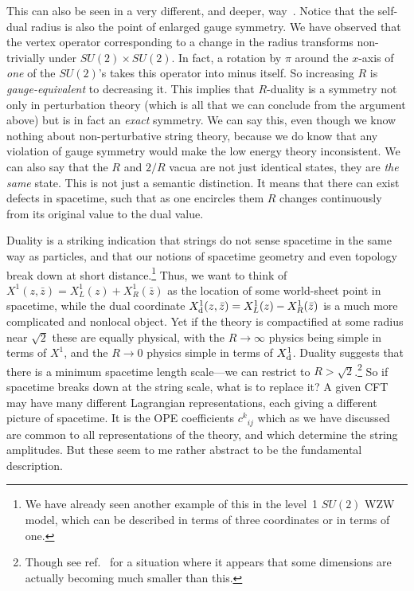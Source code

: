 This can also be seen in a very different, and deeper,
way~\cite{DHS}. Notice that the self-dual radius is also the point of
enlarged gauge symmetry.  We have observed that the vertex operator
corresponding to a change in the radius transforms non-trivially
under $SU(2) \times SU(2)$.  In fact, a rotation by $\pi$ around the
$x$-axis of {\it one} of the $SU(2)$'s takes this operator into minus
itself. So increasing $R$ is {\it gauge-equivalent} to decreasing it.
This implies that $R$-duality is a symmetry not only in perturbation
theory (which is all that we can conclude from the argument above)
but is in fact an {\it exact} symmetry.  We can say this, even
though we know nothing about non-perturbative string theory,
because we do know that any violation of gauge symmetry would make
the low energy theory inconsistent.  We can also say that the
$R$ and $2/R$ vacua are not just identical states, they are {\it the
same} state.  This is not just a semantic distinction.  It means
that there can exist defects in spacetime, such that as one
encircles them $R$ changes continuously from its original value
to the dual value.

Duality is a striking indication that strings do not sense
spacetime in the same way as particles, and that our
notions of spacetime geometry and even topology break down at short
distance.\footnote{We have already seen another example of this in the
level~1 $SU(2)$ WZW model, which can be described in terms of three
coordinates or in terms of one.}  Thus, we want to
think of $X^{1}(z,\bar z) = X^{1}_L(z) + X^{1}_R(\bar z)$ as the
location of some world-sheet point in spacetime, while the dual
coordinate $X_{\rm d}^{1}(z,\bar z) = X^{1}_L(z) - X^{1}_R(\bar z)$
is a much more complicated and nonlocal object.  Yet if the theory
is compactified at some radius near $\sqrt{2}$ these are equally
physical, with the $R \to \infty$ physics being simple in
terms of $X^{1}$, and the $R \to 0$ physics simple in terms of
$X_{\rm d}^{1}$.  Duality suggests that there is a minimum spacetime
length scale---we can restrict to $R > \sqrt{2}$.\footnote
{Though see ref.~\cite{GPS} for a situation where it
appears that some dimensions are actually becoming much smaller than
this.}  So if spacetime breaks
down at the string scale, what is to replace it?  A given CFT may
have many different Lagrangian representations, each giving a
different picture of spacetime. It is the OPE coefficients
$c^k\!_{ij}$ which as we have discussed are common to all
representations of the theory, and which determine the string
amplitudes.  But these seem to me rather abstract to be the
fundamental description.

